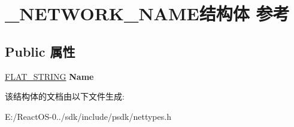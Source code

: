 \hypertarget{struct___n_e_t_w_o_r_k___n_a_m_e}{}\section{\+\_\+\+N\+E\+T\+W\+O\+R\+K\+\_\+\+N\+A\+M\+E结构体 参考}
\label{struct___n_e_t_w_o_r_k___n_a_m_e}
\subsection*{Public 属性}
\begin{DoxyCompactItemize}
\item 
\mbox{\label{struct___n_e_t_w_o_r_k___n_a_m_e_a68bb84b155a8762e4db1902d3291ccc7}} 
\hyperlink{struct___f_l_a_t___s_t_r_i_n_g}{F\+L\+A\+T\+\_\+\+S\+T\+R\+I\+NG} {\bfseries Name}
\end{DoxyCompactItemize}


该结构体的文档由以下文件生成\+:\begin{DoxyCompactItemize}
\item 
E\+:/\+React\+O\+S-\/0../sdk/include/psdk/nettypes.\+h\end{DoxyCompactItemize}
